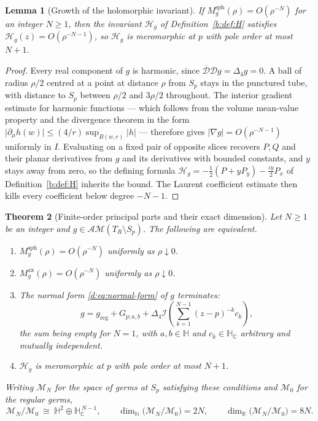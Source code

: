 \documentclass[11pt,a4paper]{article}
\numberwithin{equation}{section}
\newtheorem{theorem}{Theorem}[section]
\newtheorem{lemma}[theorem]{Lemma}
\theoremstyle{definition}
\theoremstyle{remark}
\theoremstyle{plain}
\newcommand{\HH}{\mathbb H}
\newcommand{\HC}{\mathbb H_{\mathbb C}}
\newcommand{\RR}{\mathbb R}
\newcommand{\Dop}{\mathcal D}
\newcommand{\lap}{\Delta_4}
\newcommand{\I}{\mathcal I}
\newcommand{\AM}{\mathcal{AM}}
\newcommand{\Sp}{S_{p}}
\newcommand{\Hg}{\mathcal H_{g}}      %
\newcommand{\Msph}{M^{\mathrm{sph}}}                  %
\newcommand{\Max}{M^{\mathrm{ax}}}                    %
\newcommand{\Tube}{T}
\newcommand{\abs}[1]{\lvert #1\rvert}
\begin{document}
\begin{lemma}[Growth of the holomorphic invariant]
\label{d:lem:detector-growth}
If $\Msph_g(\rho)=O(\rho^{-N})$ for an integer $N\ge1$, then the invariant
$\Hg$ of Definition~\ref{b:def:H} satisfies $\Hg(z)=O(\rho^{-N-1})$, so $\Hg$ is
meromorphic at $p$ with pole order at most $N+1$.
\end{lemma}

\begin{proof}
Every real component of $g$ is harmonic, since
$\overline{\Dop}\Dop g=\lap g=0$.  A ball of radius $\rho/2$ centred at a
point at distance $\rho$ from $\Sp$ stays in the punctured tube, with
distance to $\Sp$ between $\rho/2$ and $3\rho/2$ throughout.  The interior
gradient estimate for harmonic functions --- which follows from the volume
mean-value property and the divergence theorem in the form
$\abs{\partial_\mu h(w)}\le(4/r)\sup_{B(w,r)}\abs h$ --- therefore gives
$\abs{\nabla g}=O(\rho^{-N-1})$ uniformly in $I$.  Evaluating on a fixed
pair of opposite slices recovers $P,Q$ and their planar derivatives from
$g$ and its derivatives with bounded constants, and $y$ stays away from
zero, so the defining formula
$\Hg=-\tfrac12(P+yP_y)-\tfrac{\iota y}2P_x$ of Definition~\ref{b:def:H}
inherits the bound.  The Laurent coefficient estimate then kills every coefficient below
degree $-N-1$.
\end{proof}

\begin{theorem}[Finite-order principal parts and their exact dimension]
\label{d:thm:growth}
Let $N\ge1$ be an integer and $g\in\AM(\Tube_R\setminus\Sp)$.  The
following are equivalent.
\begin{enumerate}[label=\textup{(\roman*)}]
\item $\Msph_g(\rho)=O(\rho^{-N})$ uniformly as $\rho\downarrow0$.
\item $\Max_g(\rho)=O(\rho^{-N})$ uniformly as $\rho\downarrow0$.
\item The normal form \eqref{d:eq:normal-form} of $g$ terminates:
\begin{equation}
 g=g_{\mathrm{reg}}+G_{p;a,b}
   +\lap\I\left(\sum_{k=1}^{N-1}(z-p)^{-k}c_k\right),
 \label{d:eq:finite-normal}
\end{equation}
the sum being empty for $N=1$, with $a,b\in\HH$ and $c_k\in\HC$ arbitrary
and mutually independent.
\item $\Hg$ is meromorphic at $p$ with pole order at most $N+1$.
\end{enumerate}
Writing $\mathcal M_N$ for the space of germs at $\Sp$ satisfying these
conditions and $\mathcal M_0$ for the regular germs,
\begin{equation}
 \mathcal M_N/\mathcal M_0\ \cong\ \HH^2\oplus\HC^{\,N-1},
 \qquad
 \dim_{\HH}\bigl(\mathcal M_N/\mathcal M_0\bigr)=2N,
 \qquad
 \dim_{\RR}\bigl(\mathcal M_N/\mathcal M_0\bigr)=8N .
 \label{d:eq:local-dim}
\end{equation}
\end{theorem}
\end{document}
